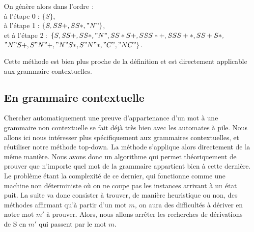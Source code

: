\documentclass[a4paper,10pt]{article}
\begin{document}
On génère alors dans l'ordre :\\
à l'étape 0 : $\{S\}$, \\
à l'étape 1 : $\{S,SS+,SS*,"N"\}$,\\
et à l'étape 2 : $\{S,SS+,SS*,"N",SS*S+,SSS*+,SSS+*,SS+S*,$ \\
$"N"S+,S"N"+,"N"S*,S"N"*,"C","NC"\}$.

Cette méthode est bien plus proche de la définition et est directement applicable aux grammaire contextuelles.

\subsection{En grammaire contextuelle}

Chercher automatiquement une preuve d'appartenance d'un mot à une grammaire non contextuelle se fait déjà très bien avec les automates à pile.
Nous allons ici nous intéresser plus spécifiquement aux grammaires contextuelles, et réutiliser notre méthode top-down.
La méthode s'applique alors directement de la même manière.
Nous avons donc un algorithme qui permet théoriquement de prouver que n'importe quel mot de la grammaire appartient bien à cette dernière.
Le problème étant la complexité de ce dernier, qui fonctionne comme une machine non déterministe où on ne coupe pas les instances arrivant à un état puit.
La suite va donc consister à trouver, de manière heuristique ou non, des méthodes affirmant qu'à partir d'un mot $m$, on aura des difficultés à dériver en notre mot $m'$ à prouver.
Alors, nous allons arrêter les recherches de dérivations de S en $m'$ qui passent par le mot $m$.
\end{document}
